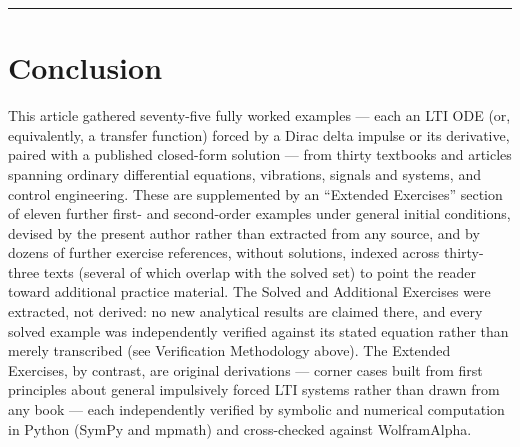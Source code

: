 \documentclass[
  11pt,
]{article}
\begin{document}
\begin{center}\rule{0.5\linewidth}{0.5pt}\end{center}

\hypertarget{conclusion}{%
\section{Conclusion}\label{conclusion}}

This article gathered seventy-five fully worked examples --- each an LTI
ODE (or, equivalently, a transfer function) forced by a Dirac delta
impulse or its derivative, paired with a published closed-form solution
--- from thirty textbooks and articles spanning ordinary differential
equations, vibrations, signals and systems, and control engineering.
These are supplemented by an ``Extended Exercises'' section of eleven
further first- and second-order examples under general initial
conditions, devised by the present author rather than extracted from any
source, and by dozens of further exercise references, without solutions,
indexed across thirty-three texts (several of which overlap with the
solved set) to point the reader toward additional practice material. The
Solved and Additional Exercises were extracted, not derived: no new
analytical results are claimed there, and every solved example was
independently verified against its stated equation rather than merely
transcribed (see Verification Methodology above). The Extended
Exercises, by contrast, are original derivations --- corner cases built
from first principles about general impulsively forced LTI systems
rather than drawn from any book --- each independently verified by
symbolic and numerical computation in Python (SymPy and mpmath) and
cross-checked against WolframAlpha.
\end{document}
